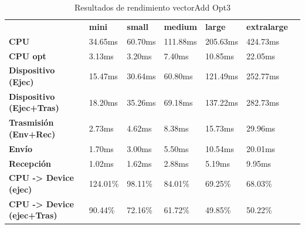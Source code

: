 \begin{table}[H]
    \centering
    \begin{tabular}{lllllll}
    \rowcolor[HTML]{DAE8FC} \ &  \textbf{mini} &  \textbf{small} &  \textbf{medium} &  \textbf{	large} &  \textbf{	extralarge} \\
    \cellcolor[HTML]{DAE8FC} \textbf{CPU} & 34.65ms & 60.70ms & 111.88ms & 	205.63ms & 	424.73ms \\
    \rowcolor[HTML]{EFEFEF} \cellcolor[HTML]{DAE8FC} \textbf{CPU opt} & 3.13ms & 3.20ms & 7.40ms & 	10.85ms & 	22.05ms \\
    \cellcolor[HTML]{DAE8FC} \textbf{Dispositivo (Ejec)} & 15.47ms & 30.64ms & 60.80ms & 	121.49ms & 	252.77ms \\
    \rowcolor[HTML]{EFEFEF} \cellcolor[HTML]{DAE8FC} \textbf{Dispositivo (Ejec+Tras)} & 18.20ms & 35.26ms & 69.18ms & 	137.22ms & 	282.73ms \\
    \cellcolor[HTML]{DAE8FC} \textbf{Trasmisión (Env+Rec)} & 2.73ms & 4.62ms & 8.38ms & 	15.73ms & 	29.96ms \\
    \rowcolor[HTML]{EFEFEF} \cellcolor[HTML]{DAE8FC} \textbf{Envío} & 1.70ms & 3.00ms & 5.50ms & 	10.54ms & 	20.01ms \\
    \cellcolor[HTML]{DAE8FC} \textbf{Recepción} & 1.02ms & 1.62ms & 2.88ms & 	5.19ms & 	9.95ms \\
    \rowcolor[HTML]{EFEFEF} \cellcolor[HTML]{DAE8FC} \textbf{CPU -> Device (ejec)} & 124.01\% & 98.11\% & 84.01\% & 	69.25\% & 	68.03\% \\
    \cellcolor[HTML]{DAE8FC} \textbf{CPU -> Device (ejec+Tras)} & 90.44\% & 72.16\% & 61.72\% & 	49.85\% & 	50.22\% \\
    \end{tabular}
    \caption[Resultados de rendimiento vectorAdd Opt3]{{Resultados de rendimiento vectorAdd Opt3}}
    \label{table_test_vectorAdd_Opt3_hw_performanceResults}
\end{table}
